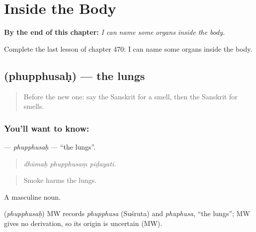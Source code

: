 
\chapter{Inside the Body}
\label{ch:sa-inside-the-body}

\begin{chapteropening}
\textbf{By the end of this chapter:} \emph{I can name some organs inside the body.}

Complete the last lesson of chapter 470: I can name some organs inside the body.
\end{chapteropening}

\section[\texorpdfstring{\sk{फुप्फुसः} (phupphusaḥ)}{फुप्फुसः (phupphusaḥ)}]{ (phupphusaḥ) — the lungs}

\label{lesson:SA-C470-phupphusah}



\begin{quote}
Before the new one: say the Sanskrit for a smell, then the Sanskrit for smells.
\end{quote}

\subsection*{You'll want to know: }
\textbf{} — \emph{phupphusaḥ} — \textquotedblleft{}the lungs\textquotedblright{}.

\begin{quote}
  
\end{quote}

\begin{quote}
\emph{dhūmaḥ phupphusaṃ pīḍayati.}
\end{quote}

\begin{quote}
Smoke harms the lungs.
\end{quote}

A masculine noun.

\begin{cousinweb}
\textbf{} (\emph{phupphusaḥ}) MW records \emph{phupphusa} (Suśruta) and \emph{phuphusa}, \textquotedblleft{}the lungs\textquotedblright{}; MW gives no derivation, so its origin is uncertain (MW).
\end{cousinweb}

